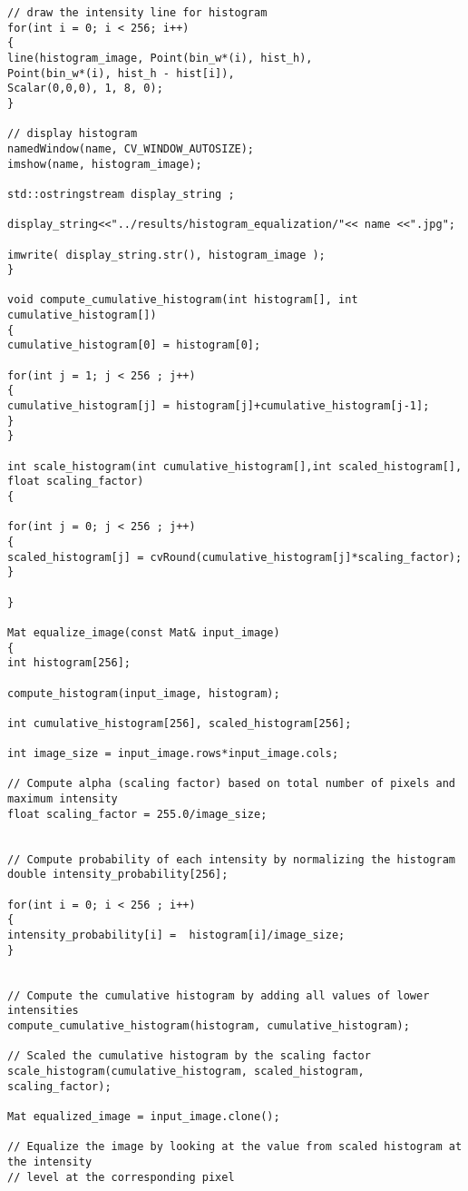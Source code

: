 \begin{lstlisting}
// draw the intensity line for histogram
for(int i = 0; i < 256; i++)
{
line(histogram_image, Point(bin_w*(i), hist_h),
Point(bin_w*(i), hist_h - hist[i]),
Scalar(0,0,0), 1, 8, 0);
}

// display histogram
namedWindow(name, CV_WINDOW_AUTOSIZE);
imshow(name, histogram_image);

std::ostringstream display_string ;

display_string<<"../results/histogram_equalization/"<< name <<".jpg";

imwrite( display_string.str(), histogram_image );
}

void compute_cumulative_histogram(int histogram[], int cumulative_histogram[])
{
cumulative_histogram[0] = histogram[0];

for(int j = 1; j < 256 ; j++)
{
cumulative_histogram[j] = histogram[j]+cumulative_histogram[j-1];
}
}

int scale_histogram(int cumulative_histogram[],int scaled_histogram[], float scaling_factor)
{

for(int j = 0; j < 256 ; j++)
{
scaled_histogram[j] = cvRound(cumulative_histogram[j]*scaling_factor);
}

}

Mat equalize_image(const Mat& input_image)
{
int histogram[256];

compute_histogram(input_image, histogram);

int cumulative_histogram[256], scaled_histogram[256];

int image_size = input_image.rows*input_image.cols;

// Compute alpha (scaling factor) based on total number of pixels and maximum intensity   
float scaling_factor = 255.0/image_size;


// Compute probability of each intensity by normalizing the histogram
double intensity_probability[256];

for(int i = 0; i < 256 ; i++)
{
intensity_probability[i] =  histogram[i]/image_size;
}


// Compute the cumulative histogram by adding all values of lower intensities
compute_cumulative_histogram(histogram, cumulative_histogram);

// Scaled the cumulative histogram by the scaling factor
scale_histogram(cumulative_histogram, scaled_histogram, scaling_factor);

Mat equalized_image = input_image.clone();

// Equalize the image by looking at the value from scaled histogram at the intensity 
// level at the corresponding pixel


\end{lstlisting}
